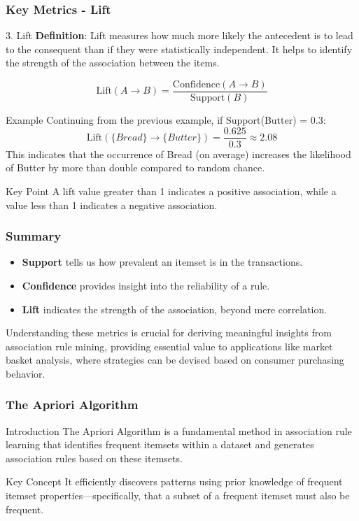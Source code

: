 \documentclass{beamer}
\begin{document}
\begin{frame}[fragile]
    \frametitle{Key Metrics - Lift}
    \begin{block}{3. Lift}
        \textbf{Definition}: Lift measures how much more likely the antecedent is to lead to the consequent than if they were statistically independent. It helps to identify the strength of the association between the items.
    \end{block}
    \begin{equation}
        \text{Lift}(A \rightarrow B) = \frac{\text{Confidence}(A \rightarrow B)}{\text{Support}(B)}
    \end{equation}
    \begin{block}{Example}
        Continuing from the previous example, if Support(Butter) = 0.3:
        \begin{equation}
            \text{Lift}(\{Bread\} \rightarrow \{Butter\}) = \frac{0.625}{0.3} \approx 2.08
        \end{equation}
        This indicates that the occurrence of Bread (on average) increases the likelihood of Butter by more than double compared to random chance.
    \end{block}
    \begin{block}{Key Point}
        A lift value greater than 1 indicates a positive association, while a value less than 1 indicates a negative association.
    \end{block}
\end{frame}

\begin{frame}[fragile]
    \frametitle{Summary}
    \begin{itemize}
        \item \textbf{Support} tells us how prevalent an itemset is in the transactions.
        \item \textbf{Confidence} provides insight into the reliability of a rule.
        \item \textbf{Lift} indicates the strength of the association, beyond mere correlation.
    \end{itemize}
    Understanding these metrics is crucial for deriving meaningful insights from association rule mining, providing essential value to applications like market basket analysis, where strategies can be devised based on consumer purchasing behavior.
\end{frame}

\begin{frame}[fragile]
    \frametitle{The Apriori Algorithm}
    \begin{block}{Introduction}
        The Apriori Algorithm is a fundamental method in association rule learning that identifies frequent itemsets within a dataset and generates association rules based on these itemsets. 
    \end{block}
    \begin{block}{Key Concept}
        It efficiently discovers patterns using prior knowledge of frequent itemset properties—specifically, that a subset of a frequent itemset must also be frequent.
    \end{block}
\end{frame}
\end{document}

